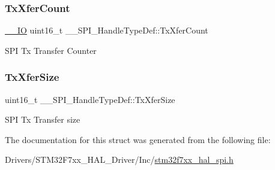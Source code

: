 \subsubsection{\texorpdfstring{TxXferCount}{TxXferCount}}
{\footnotesize\ttfamily \mbox{\hyperlink{core__sc300_8h_aec43007d9998a0a0e01faede4133d6be}{\+\_\+\+\_\+\+IO}} uint16\+\_\+t \+\_\+\+\_\+\+S\+P\+I\+\_\+\+Handle\+Type\+Def\+::\+Tx\+Xfer\+Count}

S\+PI Tx Transfer Counter \mbox{\label{struct_____s_p_i___handle_type_def_a5617a3a7983aedb0d214f318062ebc48}} 
\subsubsection{\texorpdfstring{TxXferSize}{TxXferSize}}
{\footnotesize\ttfamily uint16\+\_\+t \+\_\+\+\_\+\+S\+P\+I\+\_\+\+Handle\+Type\+Def\+::\+Tx\+Xfer\+Size}

S\+PI Tx Transfer size 

The documentation for this struct was generated from the following file\+:\begin{DoxyCompactItemize}
\item 
Drivers/\+S\+T\+M32\+F7xx\+\_\+\+H\+A\+L\+\_\+\+Driver/\+Inc/\mbox{\hyperlink{stm32f7xx__hal__spi_8h}{stm32f7xx\+\_\+hal\+\_\+spi.\+h}}\end{DoxyCompactItemize}
